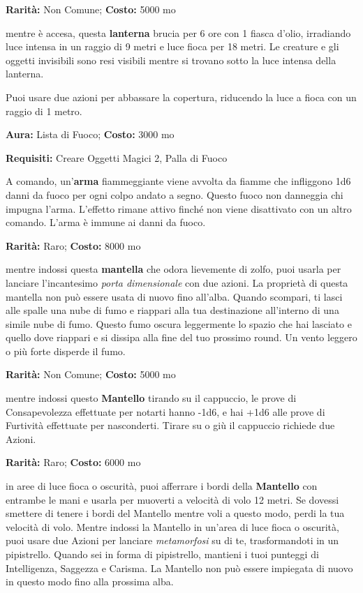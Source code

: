 \begin{multicols}{2}

\textbf{Rarità:} Non Comune; \textbf{Costo:} 5000 mo

mentre è accesa, questa \textbf{lanterna} brucia per 6 ore con 1 fiasca d'olio, irradiando luce intensa in un raggio di 9 metri e luce fioca per 18 metri. Le creature e gli oggetti invisibili sono resi visibili mentre si trovano sotto la luce intensa della lanterna.

Puoi usare due azioni per abbassare la copertura, riducendo la luce a fioca con un raggio di 1 metro.


\textbf{Aura:} Lista di Fuoco; \textbf{Costo:} 3000 mo

\textbf{Requisiti:} Creare Oggetti Magici 2, Palla di Fuoco

A comando, un'\textbf{arma} fiammeggiante viene avvolta da fiamme che infliggono 1d6 danni da fuoco per ogni colpo andato a segno. Questo fuoco non danneggia chi impugna l'arma. L'effetto rimane attivo finché non viene disattivato con un altro comando. L'arma è immune ai danni da fuoco.


\textbf{Rarità:} Raro; \textbf{Costo:} 8000 mo

mentre indossi questa \textbf{mantella} che odora lievemente di zolfo, puoi usarla per lanciare l'incantesimo \emph{porta dimensionale} con due azioni. La proprietà di questa mantella non può essere usata di nuovo fino all'alba. Quando scompari, ti lasci alle spalle una nube di fumo e riappari alla tua destinazione all'interno di una simile nube di fumo. Questo fumo oscura leggermente lo spazio che hai lasciato e quello dove riappari e si dissipa alla fine del tuo prossimo round. Un vento leggero o più forte disperde il fumo.


\textbf{Rarità:} Non Comune; \textbf{Costo:} 5000 mo

mentre indossi questo \textbf{Mantello} tirando su il cappuccio, le prove di Consapevolezza effettuate per notarti hanno -1d6, e hai +1d6 alle prove di Furtività effettuate per nasconderti. Tirare su o giù il cappuccio richiede due Azioni.


\textbf{Rarità:} Raro; \textbf{Costo:} 6000 mo

in aree di luce fioca o oscurità, puoi afferrare i bordi della \textbf{Mantello} con entrambe le mani e usarla per muoverti a velocità di volo 12 metri. Se dovessi smettere di tenere i bordi del Mantello mentre voli a questo modo, perdi la tua velocità di volo. Mentre indossi la Mantello in un'area di luce fioca o oscurità, puoi usare due Azioni per lanciare \emph{metamorfosi} su di te, trasformandoti in un pipistrello. Quando sei in forma di pipistrello, mantieni i tuoi punteggi di Intelligenza, Saggezza e Carisma. La Mantello non può essere impiegata di nuovo in questo modo fino alla prossima alba.


\end{multicols}
